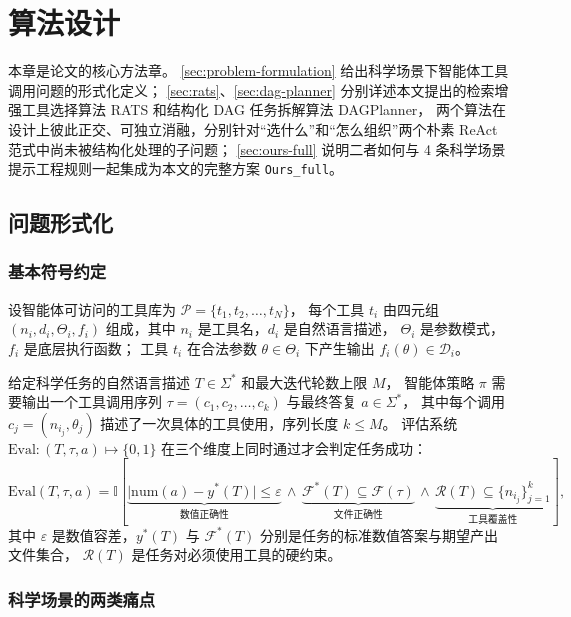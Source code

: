 \clearpage

\section{算法设计}

本章是论文的核心方法章。
\autoref{sec:problem-formulation} 给出科学场景下智能体工具调用问题的形式化定义；
\autoref{sec:rats}、\autoref{sec:dag-planner} 分别详述本文提出的检索增强工具选择算法 RATS 和结构化 DAG 任务拆解算法 DAGPlanner，
两个算法在设计上彼此正交、可独立消融，分别针对“选什么”和“怎么组织”两个朴素 ReAct 范式中尚未被结构化处理的子问题；
\autoref{sec:ours-full} 说明二者如何与 4 条科学场景提示工程规则一起集成为本文的完整方案 \texttt{Ours\_full}。

\subsection{问题形式化}\label{sec:problem-formulation}

\subsubsection{基本符号约定}

设智能体可访问的工具库为 $\mathcal{P}=\{t_1, t_2, \dots, t_N\}$，
每个工具 $t_i$ 由四元组 $(n_i, d_i, \Theta_i, f_i)$ 组成，其中 $n_i$ 是工具名，$d_i$ 是自然语言描述，
$\Theta_i$ 是参数模式，$f_i$ 是底层执行函数；
工具 $t_i$ 在合法参数 $\theta\in\Theta_i$ 下产生输出 $f_i(\theta)\in\mathcal{D}_i$。

给定科学任务的自然语言描述 $T\in\Sigma^*$ 和最大迭代轮数上限 $M$，
智能体策略 $\pi$ 需要输出一个工具调用序列 $\tau=(c_1, c_2, \dots, c_k)$ 与最终答复 $a\in\Sigma^*$，
其中每个调用 $c_j=(n_{i_j}, \theta_j)$ 描述了一次具体的工具使用，序列长度 $k\le M$。
评估系统 $\mathrm{Eval}: (T,\tau,a)\mapsto\{0,1\}$ 在三个维度上同时通过才会判定任务成功：
\begin{equation}
\mathrm{Eval}(T,\tau,a)=
\mathbb{I}\!\left[
\underbrace{\big|\mathrm{num}(a)-y^{*}(T)\big|\le\varepsilon}_{\text{数值正确性}}
\,\wedge\,
\underbrace{\mathcal{F}^{*}(T)\subseteq\mathcal{F}(\tau)}_{\text{文件正确性}}
\,\wedge\,
\underbrace{\mathcal{R}(T)\subseteq\{n_{i_j}\}_{j=1}^{k}}_{\text{工具覆盖性}}
\right],
\label{eq:eval-criteria}
\end{equation}
其中 $\varepsilon$ 是数值容差，$y^{*}(T)$ 与 $\mathcal{F}^{*}(T)$ 分别是任务的标准数值答案与期望产出文件集合，
$\mathcal{R}(T)$ 是任务对必须使用工具的硬约束。

\subsubsection{科学场景的两类痛点}

